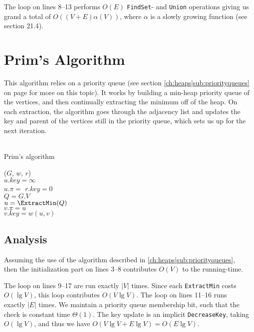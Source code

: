 The loop on lines 8--13 performs $O(E)$ \texttt{FindSet}- and \texttt{Union}
operations giving us grand a total of $O((V+E) \alpha(V))$, where $\alpha$
is a slowly growing function (see section 21.4\cite[p. 573]{clrs}).

\newpage
\section{Prim's Algorithm}
This algorithm relies on a priority queue (see section
\ref{ch:heaps|sub:priorityqueues} on page \pageref{ch:heaps|sub:priorityqueues}
for more on this topic). It works by building a min-heap priority queue of the
vertices, and then continually extracting the minimum off of the heap. On each
extraction, the algorithm goes through the adjacency list and updates the key
and parent of the vertices still in the priority queue, which sets us up for
the next iteration.
\\\\
\begin{algorithm}[H]
	\caption{Prim's algorithm}
	\label{alg:prim-mst}
	
	
	
	
	
	\BlankLine
	\PrimMST($G$, $w$, $r$) \\
	\Begin
	{
		{
			$u.key = \infty$ \\
			$u.\pi = $ \Nil
		}
		$r.key = 0$ \\
		$Q = G.V$ \\
		
		{
			$u = \ExtractMin(Q)$ \\
			{
				{
					$v.\pi = u$ \\
					$v.key = w(u, v)$
				}
			}
		}
	}
\end{algorithm}

\subsection{Analysis}
Assuming the use of the algorithm described in
\ref{ch:heaps|sub:priorityqueues}, then the initialization part on lines 3--8
contributes $O(V)$ to the running-time.

The loop on lines 9--17 are run exactly $|V|$ times. Since each
\texttt{ExtractMin} costs $O(\lg V)$, this loop contributes $O(V \lg V)$. The
loop on lines 11--16 runs exactly $|E|$ times. We maintain a priority queue
membership bit, such that the check is constant time $\Theta(1)$. The key
update is an implicit \texttt{DecreaseKey}, taking $O(\lg V)$, and thus we
have $O(V \lg V + E \lg V) = O(E \lg V)$.

